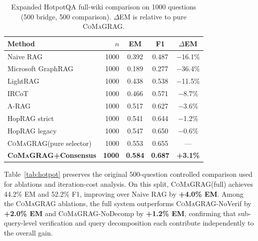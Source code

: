 \documentclass[runningheads]{llncs}
\newcommand{\sys}{\textsc{CoMaGRAG}\xspace}
\begin{document}
\begin{table}[t]
\centering
\caption{Expanded HotpotQA full-wiki comparison on 1000 questions
(500 bridge, 500 comparison). $\Delta$EM is relative to pure \sys.}
\label{tab:hotpot1000}
\small
\begin{tabular}{lrccc}
\toprule
Method & $n$ & EM & F1 & $\Delta$EM \\
\midrule
Naive RAG
  & 1000 & 0.392 & 0.487 & $-$16.1\% \\
Microsoft GraphRAG~\cite{edge2024graphrag}
  & 1000 & 0.189 & 0.277 & $-$36.4\% \\
LightRAG~\cite{guo2024lightrag}
  & 1000 & 0.438 & 0.538 & $-$11.5\% \\
IRCoT~\cite{trivedi2022ircot}
  & 1000 & 0.466 & 0.571 & $-$8.7\% \\
A-RAG~\cite{arag2026}
  & 1000 & 0.517 & 0.627 & $-$3.6\% \\
HopRAG strict~\cite{yu2025hoprag}
  & 1000 & 0.541 & 0.644 & $-$1.2\% \\
HopRAG legacy~\cite{yu2025hoprag}
  & 1000 & 0.547 & 0.650 & $-$0.6\% \\
\midrule
\sys (pure selector)
  & 1000 & 0.553 & 0.655 & --- \\
\textbf{\sys+Consensus}
  & \textbf{1000} & \textbf{0.584} & \textbf{0.687} & \textbf{+3.1\%} \\
\bottomrule
\end{tabular}
\end{table}

Table~\ref{tab:hotpot} preserves the original 500-question controlled
comparison used for ablations and iteration-cost analysis. On this split,
\sys (full) achieves 44.2\% EM and 52.2\% F1, improving over Naive RAG by
\textbf{+4.0\% EM}. Among the \sys ablations, the full system outperforms
\sys-NoVerif by \textbf{+2.0\% EM} and \sys-NoDecomp by \textbf{+1.2\% EM},
confirming that sub-query-level verification and query decomposition each
contribute independently to the overall gain.
\end{document}
